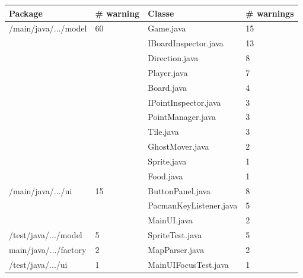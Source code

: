 \documentclass[12pt,a4paper,final]{article}
\begin{document}
\begin{tabular}{|l|l|l|l|}
\hline
Package & \# warning & Classe & \# warnings \\
\hline
/main/java/.../model & 60 & Game.java & 15 \\
&& IBoardInspector.java & 13 \\
&& Direction.java & 8 \\
&& Player.java & 7 \\
&& Board.java & 4 \\
&& IPointInspector.java & 3 \\
&& PointManager.java & 3 \\
&& Tile.java & 3 \\
&& GhostMover.java & 2 \\
&& Sprite.java & 1 \\
&& Food.java & 1 \\
\hline
/main/java/.../ui & 15 & ButtonPanel.java & 8 \\
&& PacmanKeyListener.java & 5 \\
&& MainUI.java & 2 \\
\hline
/test/java/.../model & 5 & SpriteTest.java & 5 \\
\hline
main/java/.../factory & 2 & MapParser.java & 2 \\
\hline
/test/java/.../ui & 1 & MainUIFocusTest.java & 1 \\
\hline
\end{tabular}

\end{document}
